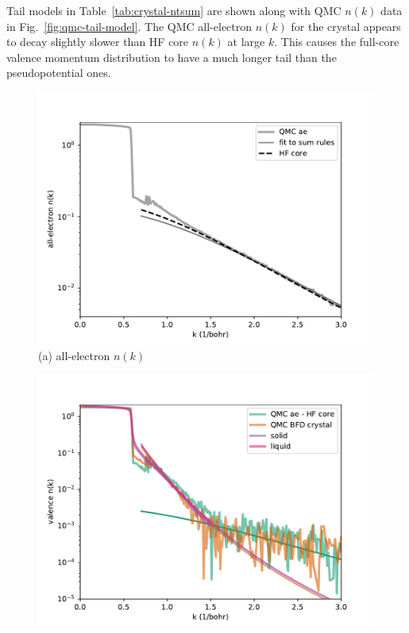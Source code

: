 \documentclass[aps,prl,superscriptaddress]{revtex4-1}
\begin{document}
Tail models in Table~\ref{tab:crystal-ntsum} are shown along with QMC $n(k)$ data in Fig.~\ref{fig:qmc-tail-model}. The QMC all-electron $n(k)$ for the crystal appears to decay slightly slower than HF core $n(k)$ at large $k$. This causes the full-core valence momentum distribution to have a much longer tail than the pseudopotential ones.

\begin{figure}[h]
\begin{minipage}{0.49\linewidth}
\includegraphics[width=\columnwidth]{li62e_ae-hf-tail}
(a) all-electron $n(k)$
\end{minipage}
\begin{minipage}{0.49\linewidth}
\includegraphics[width=\columnwidth]{li62e_valence-tail}

\end{minipage}
\end{figure}
\end{document}
